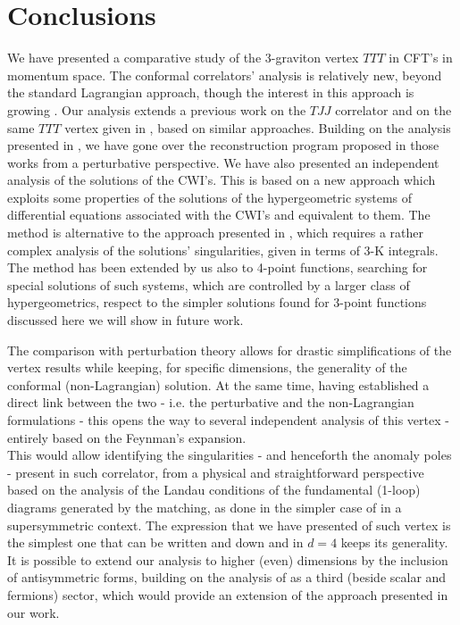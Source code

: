 \documentclass[a4paper,11pt,openright,twoside]{book}
\numberwithin{equation}{section}
\begin{document}
{{\section{Conclusions}
We have presented a comparative study of the 3-graviton vertex $TTT$ in CFT's in momentum space. The conformal correlators' analysis is relatively new, beyond the standard Lagrangian approach, though the interest in this approach is growing \cite{Isono:2018rrb,Gillioz:2018mto}. Our analysis extends a previous work on the $TJJ$ correlator \cite{Coriano:2018bbe} and on the same $TTT$ vertex given in \cite{Coriano:2012wp}, based on similar approaches. Building on the analysis presented in \cite{Bzowski:2013sza, Bzowski:2017poo}, we have gone over the reconstruction program proposed in those works from a perturbative perspective. We have also presented an independent analysis of the solutions of the CWI's. This is based on a new approach which exploits some properties of the solutions of the hypergeometric systems of differential equations associated with the CWI's and equivalent to them. The method is alternative to the approach presented in \cite{Bzowski:2013sza}, which requires a rather complex analysis of the solutions' singularities, given in terms of 3-K integrals. 
The method has been extended by us also to 4-point functions, searching for special solutions of such systems, which are controlled by a larger class of hypergeometrics, respect to the simpler solutions found for 3-point functions discussed here we will show in future work.

The comparison with perturbation theory allows for drastic simplifications of the vertex results while keeping, for specific dimensions, the generality of the conformal 
(non-Lagrangian) solution. At the same time, having established a direct link between the two - i.e. the perturbative and the non-Lagrangian formulations - this opens the way to several independent analysis of this vertex - entirely based on the Feynman's expansion. \\
This would allow identifying the singularities - and henceforth the anomaly poles - present in such correlator, from a physical and straightforward perspective based on the analysis of the Landau conditions of the fundamental (1-loop) diagrams generated by the matching, as done in the simpler case of \cite{Coriano:2014gja} in a supersymmetric context.
The expression that we have presented of such vertex is the simplest one that can be written and down and in $d=4$ keeps its generality. It is possible to extend our analysis to higher (even) dimensions by the inclusion of antisymmetric forms, building on the analysis of \cite{Bastianelli:2000rs} as a third (beside scalar and fermions) sector, which would provide an extension of the approach presented in our work. 

}}
\end{document}
